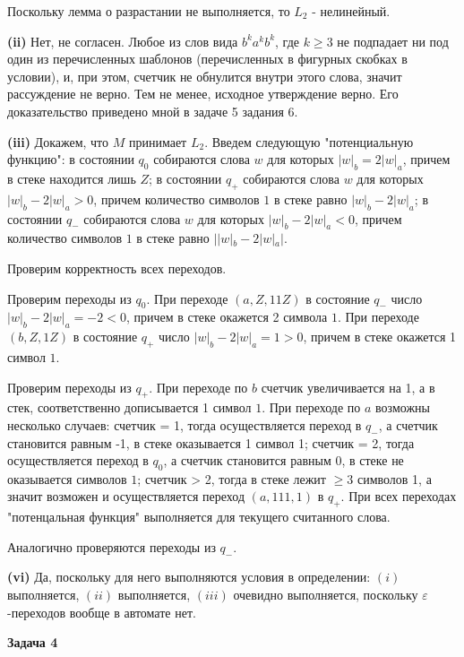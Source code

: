 \documentclass[10pt]{article}
\let \eps \varepsilon
\begin{document}
Поскольку лемма о разрастании не выполняется, то $L_2$ - нелинейный.

\smallskip

{\bf (ii)}
Нет, не согласен. Любое из слов вида $b^k a^k b^k$, где $k \geq 3$ не подпадает ни под один из перечисленных шаблонов (перечисленных в фигурных скобках в условии), и, при этом, счетчик не обнулится внутри этого слова, значит рассуждение не верно.
Тем не менее, исходное утверждение верно. Его доказательство приведено мной в задаче 5 задания 6.

\smallskip

{\bf (iii)}
Докажем, что $M$ принимает $L_2$. Введем следующую "потенциальную функцию":
в состоянии $q_0$ собираются слова $w$ для которых $|w|_b = 2 |w|_a$, причем в стеке находится лишь $Z$;
в состоянии $q_{+}$ собираются слова $w$ для которых $|w|_b - 2 |w|_a > 0$, причем количество символов $1$ в стеке равно $|w|_b - 2 |w|_a$;
в состоянии $q_{-}$ собираются слова $w$ для которых $|w|_b - 2 |w|_a < 0$, причем количество символов $1$ в стеке равно $||w|_b - 2 |w|_a|$.

Проверим корректность всех переходов.

Проверим переходы из $q_0$.
При переходе $(a, Z, 11Z)$ в состояние $q_{-}$ число $|w|_b - 2 |w|_a = -2 < 0$, причем в стеке окажется 2 символа $1$.
При переходе $(b, Z, 1Z)$ в состояние $q_{+}$ число $|w|_b - 2 |w|_a = 1 > 0$, причем в стеке окажется 1 символ $1$.

Проверим переходы из $q_{+}$.
При переходе по $b$ счетчик увеличивается на 1, а в стек, соответственно дописывается 1 символ $1$.
При переходе по $a$ возможны несколько случаев: счетчик = 1, тогда осуществляется переход в $q_{-}$, а счетчик становится равным -1, в стеке оказывается 1 символ 1; счетчик = 2, тогда осуществляется переход в $q_{0}$, а счетчик становится равным 0, в стеке не оказывается символов $1$; счетчик > 2, тогда в стеке лежит $\geq 3$ символов 1, а значит возможен и осуществляется переход $(a, 111, 1)$ в $q_{+}$. При всех переходах "потенцальная функция" выполняется для текущего считанного слова. 

Аналогично проверяются переходы из $q_{-}$.

\smallskip

{\bf (vi)}
Да, поскольку для него выполняются условия в определении: $(i)$ выполняется, $(ii)$ выполняется, $(iii)$ очевидно выполняется, поскольку $\eps$-переходов вообще в автомате нет.

\medskip

{\bf Задача 4}
\end{document}
